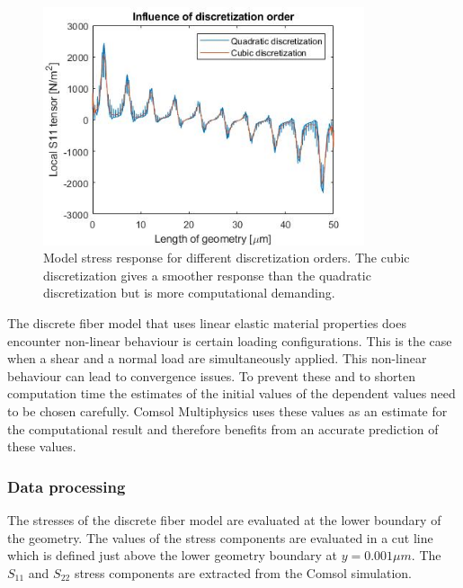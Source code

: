 \begin{figure}[h!]
    \includegraphics[width=0.65\linewidth, height=7cm, angle=0]{images/discrete_model_sensitivities/Influence_discretization_order.jpg}
    \caption{Model stress response for different discretization orders. The cubic discretization gives a smoother response than the quadratic discretization but is more computational demanding.}
    \label{fig:discretization_order}
\end{figure}

\qquad The discrete fiber model that uses linear elastic material properties does encounter non-linear behaviour is certain loading configurations. This is the case when a shear and a normal load are simultaneously applied. This non-linear behaviour can lead to convergence issues. To prevent these and to shorten computation time the estimates of the initial values of the dependent values need to be chosen carefully. Comsol Multiphysics uses these values as an estimate for the computational result and therefore benefits from an accurate prediction of these values.\\ 
    
    

\subsubsection{Data processing}\label{sec:discrete_model_data}

The stresses of the discrete fiber model are evaluated at the lower boundary of the geometry. The values of the stress components are evaluated in a cut line which is defined just above the lower geometry boundary at $y = 0.001 \mu m$. The $S_{11}$ and $S_{22}$ stress components are extracted from the Comsol simulation.\\ 


